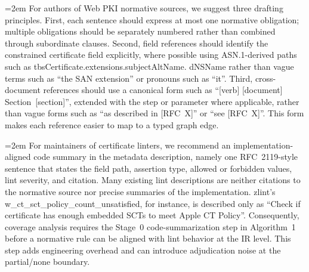 \begingroup\emergencystretch=2em\relax
For authors of Web PKI normative sources, we suggest three drafting principles. First,
each sentence should express at most one normative obligation; multiple
obligations should be separately numbered rather than combined through
subordinate clauses. Second, field references should identify the constrained
certificate field explicitly, where possible using ASN.1-derived paths such as
tbsCertificate.\allowbreak extensions.\allowbreak subjectAltName.\allowbreak
dNSName rather than vague terms such as ``the SAN extension'' or pronouns such
as ``it''. Third, cross-document references should use a canonical form such as
``[verb] [document] Section~[section]'', extended with the step or parameter
where applicable,
rather than vague forms such as ``as described in [RFC~X]'' or ``see
[RFC~X]''. This form makes each reference easier to map to a typed graph edge.
\par\endgroup


\begingroup\emergencystretch=2em\relax
For maintainers of certificate linters, we recommend an
implementation-aligned code summary in the metadata description, namely one
RFC~2119-style sentence that states the field path, assertion type, allowed or
forbidden values, lint severity, and citation. Many existing lint descriptions
are neither citations to the normative source nor precise summaries of the
implementation. zlint's w\_ct\_sct\_policy\_count\_unsatisfied, for instance,
is described only as ``Check if certificate has enough embedded SCTs to meet
Apple CT Policy''. Consequently, coverage analysis requires the Stage~0
code-summarization step in Algorithm~1 before a normative rule can be aligned
with lint behavior at the IR level. This step adds engineering overhead and can
introduce adjudication noise at the partial/none boundary.
\par\endgroup
